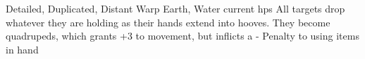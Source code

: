   {Detailed, Duplicated, Distant}%
  {Warp}%
  {Earth, Water}%
  {current \glspl{hp}}%
  {All  targets drop whatever they are holding as their hands extend into hooves.
  They become quadrupeds, which grants +3 to movement, but inflicts a - Penalty to using items in hand}%
  {}

